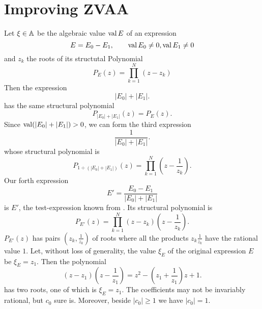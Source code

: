 %
%
\pagebreak
\section{Improving ZVAA}

Let $\xi\in\mathbb{A}$ be the algebraic value $\mathop{\rm val}\nolimits E$
of an expression 
\begin{equation}
  E = E_0 - E_1
  ,\qquad
  \mathop{\rm val}\nolimits E_0\ne 0, \mathop{\rm val}\nolimits E_1\ne 0
\end{equation}
and $z_k$ the roots of its structutal Polynomial
\begin{equation}
  P_E(z) = \prod_{k=1}^N (z-z_k)
\end{equation}
Then the expression
\begin{equation}
  |E_0| + |E_1|.
\end{equation}
has the same structural polynomial
\begin{equation}
  P_{|E_0| + |E_1|}(z) = P_E(z).
\end{equation}
Since $\mathop{\rm val}\nolimits(|E_0| + |E_1|) > 0$, we can form the third expression
\begin{equation}
  \frac{1}{|E_0| + |E_1|}.
\end{equation}
whose structural polynomial is
\begin{equation}
  P_{1\div(|E_0| + |E_1|)}(z) = \prod_{k=1}^N \left(z-\frac{1}{z_k}\right).
\end{equation}
Our forth expression
\begin{equation}
  E' = \frac{E_0 - E_1}{|E_0| + |E_1|}
\end{equation}
is $E'$, the test-expression known from \cite{ZVAA}.
Its structural polynomial is
\begin{equation}
  P_{E'}(z) = \prod_{k=1}^N \left(z-z_k\right)\left(z-\frac{1}{z_k}\right).
\end{equation}
$P_{E'}(z)$ has pairs $\left(z_k, \frac{1}{z_k}\right)$ of roots 
where all the products $z_k\frac{1}{z_k}$ 
have the rational value $1$.
Let, without loss of generality, 
the value $\xi_E$  of the original expression $E$ be $\xi_E=z_1$. 
Then the polynomial
\begin{equation}
  \left(z-z_1\right)\left(z-\frac{1}{z_1}\right)
  =
  z^2 - \left(z_1+\frac{1}{z_1}\right)z + 1.
\end{equation}
has two roots, one of which is $\xi_E=z_1$.
The coefficients may not be invariably rational,
but $c_0$ sure is. Moreover, 
beside $|c_0|\ge 1$ we have $|c_0|=1$.

